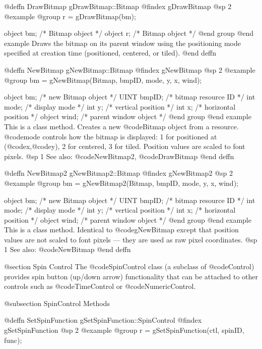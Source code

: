 @deffn {DrawBitmap} gDrawBitmap::Bitmap
@findex gDrawBitmap
@sp 2
@example
@group
r = gDrawBitmap(bm);

object  bm;   /*  Bitmap object  */
object  r;    /*  Bitmap object  */
@end group
@end example
Draws the bitmap on its parent window using the positioning mode
specified at creation time (positioned, centered, or tiled).
@end deffn



@deffn {NewBitmap} gNewBitmap::Bitmap
@findex gNewBitmap
@sp 2
@example
@group
bm = gNewBitmap(Bitmap, bmpID, mode, y, x, wind);

object    bm;      /*  new Bitmap object        */
UINT      bmpID;   /*  bitmap resource ID        */
int       mode;    /*  display mode              */
int       y;       /*  vertical position          */
int       x;       /*  horizontal position        */
object    wind;    /*  parent window object       */
@end group
@end example
This is a class method.  Creates a new @code{Bitmap} object from a
resource.  @code{mode} controls how the bitmap is displayed: 1 for
positioned at (@code{x},@code{y}), 2 for centered, 3 for tiled.
Position values are scaled to font pixels.
@sp 1
See also:  @code{NewBitmap2}, @code{DrawBitmap}
@end deffn



@deffn {NewBitmap2} gNewBitmap2::Bitmap
@findex gNewBitmap2
@sp 2
@example
@group
bm = gNewBitmap2(Bitmap, bmpID, mode, y, x, wind);

object    bm;      /*  new Bitmap object        */
UINT      bmpID;   /*  bitmap resource ID        */
int       mode;    /*  display mode              */
int       y;       /*  vertical position          */
int       x;       /*  horizontal position        */
object    wind;    /*  parent window object       */
@end group
@end example
This is a class method.  Identical to @code{gNewBitmap} except that
position values are not scaled to font pixels --- they are used as
raw pixel coordinates.
@sp 1
See also:  @code{NewBitmap}
@end deffn




@section Spin Control
The @code{SpinControl} class (a subclass of @code{Control}) provides
spin button (up/down arrow) functionality that can be attached to other
controls such as @code{TimeControl} or @code{NumericControl}.

@subsection SpinControl Methods



@deffn {SetSpinFunction} gSetSpinFunction::SpinControl
@findex gSetSpinFunction
@sp 2
@example
@group
r = gSetSpinFunction(ctl, spinID, func);

